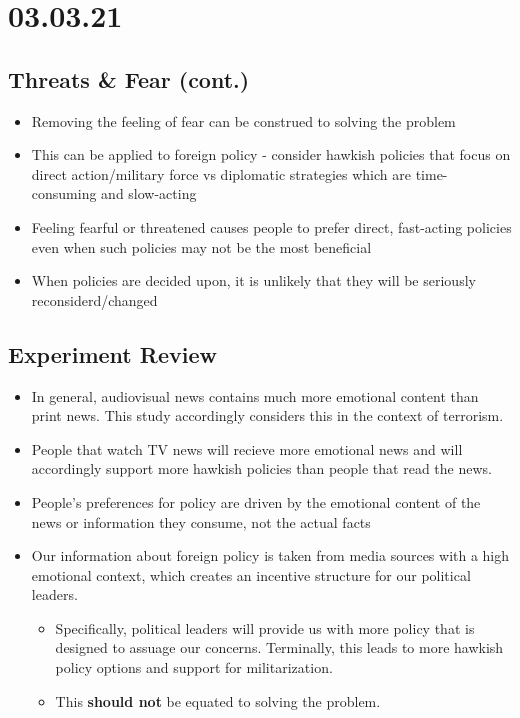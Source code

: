 \documentclass[11pt]{article}
\begin{document}
\section*{03.03.21}
\label{sec:org4b48664}
\subsection*{Threats \& Fear (cont.)}
\label{sec:org158619d}
\begin{itemize}
\item Removing the feeling of fear can be construed to solving the problem
\item This can be applied to foreign policy - consider hawkish policies that focus on direct action/military force vs diplomatic strategies which are time-consuming and slow-acting
\item Feeling fearful or threatened causes people to prefer direct, fast-acting policies even when such policies may not be the most beneficial
\item When policies are decided upon, it is unlikely that they will be seriously reconsiderd/changed
\end{itemize}
\subsection*{Experiment Review}
\label{sec:orgf56d83f}
\begin{itemize}
\item In general, audiovisual news contains much more emotional content than print news. This study accordingly considers this in the context of terrorism.
\item People that watch TV news will recieve more emotional news and will accordingly support more hawkish policies than people that read the news.
\item People's preferences for policy are driven by the emotional content of the news or information they consume, not the actual facts
\item Our information about foreign policy is taken from media sources with a high emotional context, which creates an incentive structure for our political leaders.
\begin{itemize}
\item Specifically, political leaders will provide us with more policy that is designed to assuage our concerns. Terminally, this leads to more hawkish policy options and support for militarization.
\item This \textbf{should not} be equated to solving the problem.
\end{itemize}
\end{itemize}
\end{document}
